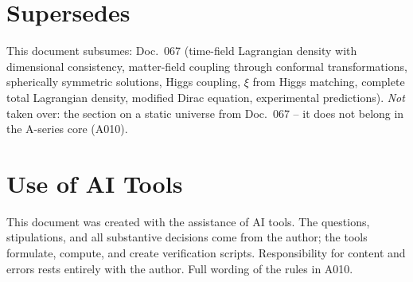 \section{Supersedes}

This document subsumes: Doc.~067 (time-field Lagrangian density with dimensional
consistency, matter-field coupling through conformal transformations, spherically
symmetric solutions, Higgs coupling, $\xi$ from Higgs matching, complete total
Lagrangian density, modified Dirac equation, experimental predictions). \emph{Not}
taken over: the section on a static universe from Doc.~067 -- it does not belong
in the A-series core (A010).

\section{Use of AI Tools}

This document was created with the assistance of AI tools. The questions,
stipulations, and all substantive decisions come from the author; the tools
formulate, compute, and create verification scripts.
Responsibility for content and errors rests entirely with the author.
Full wording of the rules in A010.
